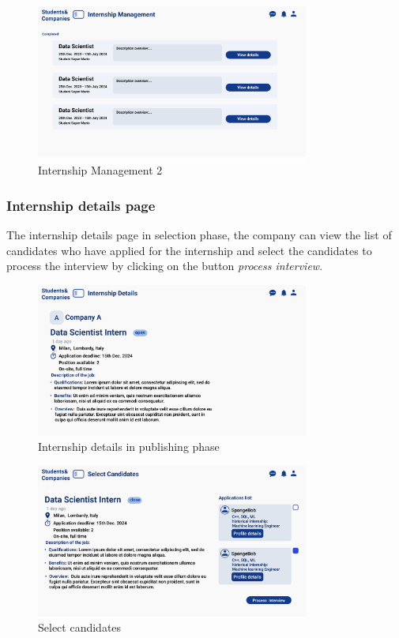 \begin{figure}[H]
    \centering
    \includegraphics[width=0.8\textwidth]{Images/UI/Internship Management2-company.png}
    \caption{Internship Management 2}\label{fig:Internship Management 2}
\end{figure}

\subsubsection{Internship details page}
The internship details page in selection phase, the company can view the list of candidates who 
have applied for the internship and select the candidates to process the interview by clicking on the button \textit{process interview}.
\begin{figure}[H]
    \centering
    \includegraphics[width=0.8\textwidth]{Images/UI/Internship details-company view.png}
    \caption{Internship details in publishing phase}\label{fig:Internship details in publishing phase}
\end{figure}
\begin{figure}[H]
    \centering
    \includegraphics[width=0.8\textwidth]{Images/UI/Select candidates.png}
    \caption{Select candidates}\label{fig:Select candidates}
\end{figure}

